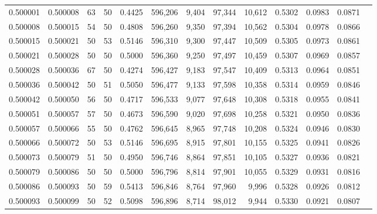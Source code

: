 \begin{tabular}{rrrrrrrrrrrrr}
0.500001 & 0.500008 &    63 &  50 &                                     0.4425 & 596,206 &   9,404 &  97,344 &  10,612 & 0.5302 & 0.0983 & 0.0871 \\
0.500008 & 0.500015 &    54 &  50 &                                     0.4808 & 596,260 &   9,350 &  97,394 &  10,562 & 0.5304 & 0.0978 & 0.0866 \\
0.500015 & 0.500021 &    50 &  53 &                                     0.5146 & 596,310 &   9,300 &  97,447 &  10,509 & 0.5305 & 0.0973 & 0.0861 \\
0.500021 & 0.500028 &    50 &  50 &                                     0.5000 & 596,360 &   9,250 &  97,497 &  10,459 & 0.5307 & 0.0969 & 0.0857 \\
0.500028 & 0.500036 &    67 &  50 &                                     0.4274 & 596,427 &   9,183 &  97,547 &  10,409 & 0.5313 & 0.0964 & 0.0851 \\
0.500036 & 0.500042 &    50 &  51 &                                     0.5050 & 596,477 &   9,133 &  97,598 &  10,358 & 0.5314 & 0.0959 & 0.0846 \\
0.500042 & 0.500050 &    56 &  50 &                                     0.4717 & 596,533 &   9,077 &  97,648 &  10,308 & 0.5318 & 0.0955 & 0.0841 \\
0.500051 & 0.500057 &    57 &  50 &                                     0.4673 & 596,590 &   9,020 &  97,698 &  10,258 & 0.5321 & 0.0950 & 0.0836 \\
0.500057 & 0.500066 &    55 &  50 &                                     0.4762 & 596,645 &   8,965 &  97,748 &  10,208 & 0.5324 & 0.0946 & 0.0830 \\
0.500066 & 0.500072 &    50 &  53 &                                     0.5146 & 596,695 &   8,915 &  97,801 &  10,155 & 0.5325 & 0.0941 & 0.0826 \\
0.500073 & 0.500079 &    51 &  50 &                                     0.4950 & 596,746 &   8,864 &  97,851 &  10,105 & 0.5327 & 0.0936 & 0.0821 \\
0.500079 & 0.500086 &    50 &  50 &                                     0.5000 & 596,796 &   8,814 &  97,901 &  10,055 & 0.5329 & 0.0931 & 0.0816 \\
0.500086 & 0.500093 &    50 &  59 &                                     0.5413 & 596,846 &   8,764 &  97,960 &   9,996 & 0.5328 & 0.0926 & 0.0812 \\
0.500093 & 0.500099 &    50 &  52 &                                     0.5098 & 596,896 &   8,714 &  98,012 &   9,944 & 0.5330 & 0.0921 & 0.0807 \\

\end{tabular}
